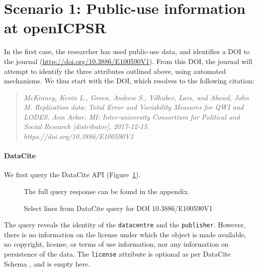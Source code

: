 

\section{Scenario 1: Public-use information at openICPSR}
In the first case, the researcher has  used public-use data, and identifies a \ac{DOI} to the journal (\url{http://doi.org/10.3886/E100590V1}). From this \ac{DOI}, the journal will attempt to identify the three attributes outlined above, using automated mechanisms. We thus start with the \ac{DOI}, which resolves to the following citation:

\begin{quote}
	\it
	McKinney, Kevin L., Green, Andrew S., Vilhuber, Lars, and Abowd, John M. Replication data: Total Error and Variability Measures for QWI and LODES. Ann Arbor, MI: Inter-university Consortium for Political and Social Research [distributor], 2017-12-15. https://doi.org/10.3886/E100590V1
\end{quote}


\paragraph{DataCite}

We first query the DataCite API (Figure~\ref{fig:case1:datacite}).
\begin{figure}
	\singlespacing
	
	
	
	
	
	
	\caption{Select lines from DataCite query for DOI 10.3886/E100590V1}
	\label{fig:case1:datacite}
	\centering \footnotesize The full query response can be found in the appendix.
\end{figure}
%
The query reveals the identity of the \texttt{datacentre} and the \texttt{publisher}. However, there is no information on the license under which the object is made available, no copyright, license, or terms of use information, nor any information on persistence of the data. The \texttt{license} attribute is optional as per DataCite Schema \parencite{DataCiteMetadataWorkingGroupDataCiteMetadataSchema2017}, and is empty here.

